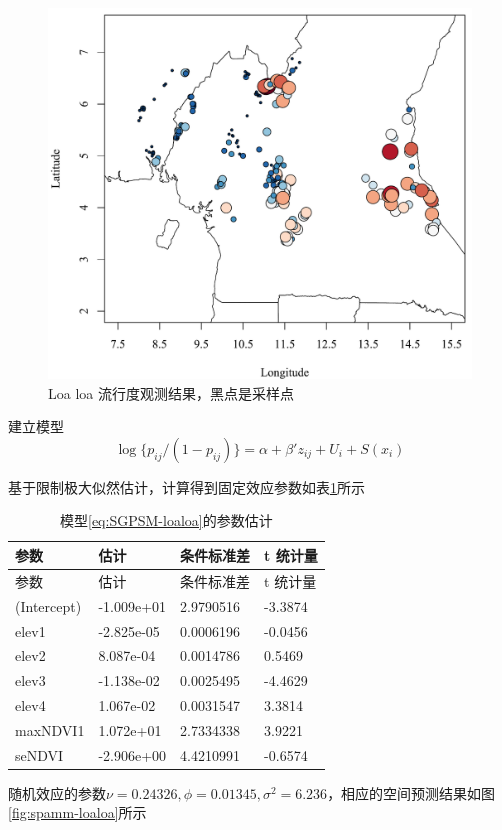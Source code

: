 \documentclass[hyperref, a4paper, UTF8, zihao = -4, linespread = 1.25, scheme = chinese]{ctexbook}
\begin{document}
\begin{figure}

{\centering \includegraphics[width=0.6\linewidth]{figures/loaloa-map} 

}

\caption{Loa loa 流行度观测结果，黑点是采样点}\label{fig:loaloa-ratio}
\end{figure}

建立模型 \begin{equation} 
\log\{p_{ij}/(1-p_{ij})\} = \alpha + \beta'z_{ij} + U_{i} + S(x_{i}) \label{eq:SGPSM-loaloa}
\end{equation}

基于限制极大似然估计，计算得到固定效应参数如表\ref{tab:loaloa-estimation}所示

\begin{longtable}[]{@{}llll@{}}
\caption{\label{tab:loaloa-estimation}
模型\eqref{eq:SGPSM-loaloa}的参数估计}\tabularnewline
\toprule
参数 & 估计 & 条件标准差 & t 统计量\tabularnewline
\midrule
\endfirsthead
\toprule
参数 & 估计 & 条件标准差 & t 统计量\tabularnewline
\midrule
\endhead
(Intercept) & -1.009e+01 & 2.9790516 & -3.3874\tabularnewline
elev1 & -2.825e-05 & 0.0006196 & -0.0456\tabularnewline
elev2 & 8.087e-04 & 0.0014786 & 0.5469\tabularnewline
elev3 & -1.138e-02 & 0.0025495 & -4.4629\tabularnewline
elev4 & 1.067e-02 & 0.0031547 & 3.3814\tabularnewline
maxNDVI1 & 1.072e+01 & 2.7334338 & 3.9221\tabularnewline
seNDVI & -2.906e+00 & 4.4210991 & -0.6574\tabularnewline
\bottomrule
\end{longtable}

随机效应的参数\(\nu = 0.24326,\phi = 0.01345,\sigma^2 = 6.236\)，相应的空间预测结果如图
\ref{fig:spamm-loaloa}所示
\end{document}
